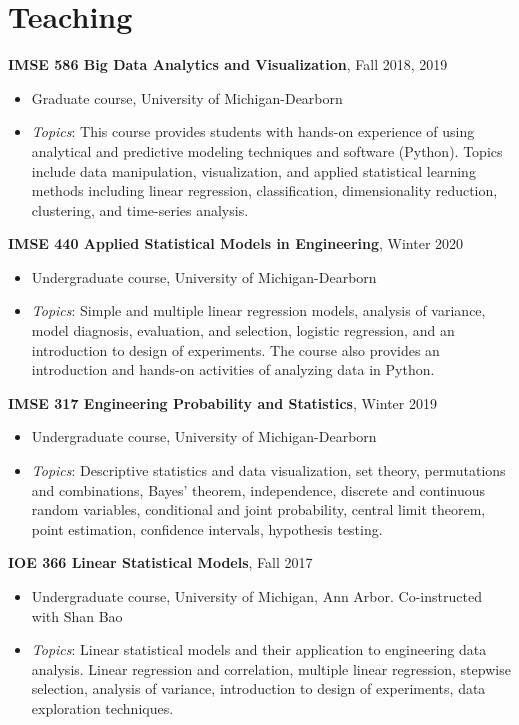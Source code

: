 \documentclass[11pt]{article}
\newenvironment{main}
{\begin{adjustwidth}{3em}{}}
{\end{adjustwidth}}
\begin{document}
\section*{Teaching}
\begin{main}

\textbf{IMSE 586 Big Data Analytics and Visualization}, Fall 2018, 2019

\begin{itemize}
    \item[] Graduate course, University of Michigan-Dearborn 
    \item[] \textit{Topics}: This course provides students with hands-on experience of using analytical and predictive modeling techniques and software (Python). Topics include data manipulation, visualization, and applied statistical learning methods including linear regression, classification, dimensionality reduction, clustering, and time-series analysis. 
\end{itemize}


\textbf{IMSE 440 Applied Statistical Models in Engineering}, Winter 2020

\begin{itemize}
    \item[] Undergraduate course, University of Michigan-Dearborn
    \item[] \textit{Topics}: Simple and multiple linear regression models, analysis of variance, model diagnosis, evaluation, and selection, logistic regression, and an introduction to design of experiments. The course also provides an introduction and hands-on activities of analyzing data in Python.
\end{itemize}


\textbf{IMSE 317 Engineering Probability and Statistics}, Winter 2019

\begin{itemize}
    \item[] Undergraduate course, University of Michigan-Dearborn
    \item[] \textit{Topics}: Descriptive statistics and data visualization, set theory, permutations and combinations, Bayes’ theorem, independence, discrete and continuous random variables, conditional and joint probability, central limit theorem, point estimation, confidence intervals, hypothesis testing. 
\end{itemize}


\textbf{IOE 366 Linear Statistical Models}, Fall 2017

\begin{itemize}
    \item[] Undergraduate course, University of Michigan, Ann Arbor. Co-instructed with Shan Bao
    \item[] \textit{Topics}: Linear statistical models and their application to engineering data analysis. Linear regression and correlation, multiple linear regression, stepwise selection, analysis of variance, introduction to design of experiments, data exploration techniques.
\end{itemize}



\end{main}
\end{document}

